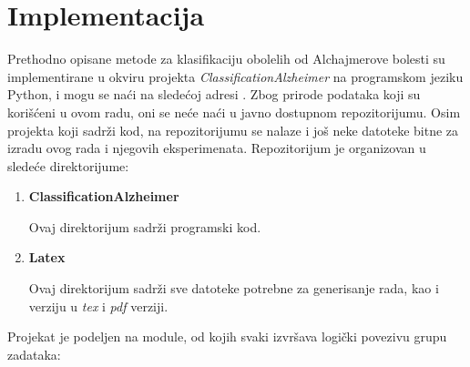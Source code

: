 \documentclass[12pt,oneside]{memoir}
\begin{document}
\chapter{Implementacija}

Prethodno opisane metode za klasifikaciju obolelih od Alchajmerove bolesti su implementirane u okviru projekta \textit{ClassificationAlzheimer} na programskom jeziku Python, i mogu se naći na sledećoj adresi \cite{github}. Zbog prirode podataka koji su korišćeni u ovom radu, oni se neće naći u javno dostupnom repozitorijumu. Osim projekta koji sadrži kod, na repozitorijumu se nalaze i još neke datoteke bitne za izradu ovog rada i njegovih eksperimenata. Repozitorijum je organizovan u sledeće direktorijume:

\begin{enumerate}
\item \textbf{ClassificationAlzheimer}

Ovaj direktorijum sadrži programski kod.

\item \textbf{Latex}

Ovaj direktorijum sadrži sve datoteke potrebne za generisanje rada, kao i verziju u \textit{tex} i \textit{pdf} verziji.

\end{enumerate}

\noindent
Projekat je podeljen na module, od kojih svaki izvršava logički povezivu grupu zadataka:
\end{document}

